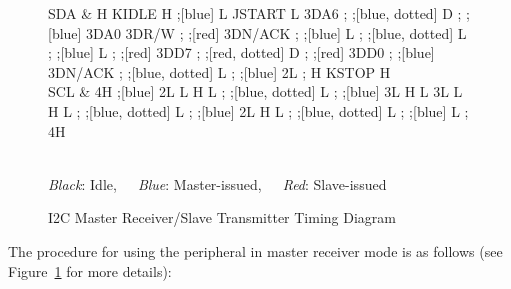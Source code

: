 \begin{figure}[h]
	\centering
	\begin{tikztimingtable}[timing/font=\rmfamily, timing/d/text/.append style={font=\rmfamily}, xscale=1.5, yscale=2, timing/slope=0.2, timing/dslope=0.2, timing/d/background/.style={fill=white},
		timing/metachar={{K}[2]{#1H !{++(-.5\xunit + 0.5*\slope\xunit, -.5\yunit)} N[rectangle,scale=.6]{#2} !{++(.5\xunit - 0.5*\slope\xunit, +.5\yunit)}}},
		timing/metachar={{J}[2]{#1L !{++(-.5\xunit + 0.5*\slope\xunit, +.5\yunit)} N[rectangle,scale=.6]{#2} !{++(.5\xunit - 0.5*\slope\xunit, -.5\yunit)}}},]
		SDA & H K{IDLE} H ;[blue] L J{START} L 3D{A6} ; ;[blue, dotted] D{} ; ;[blue] 3D{A0} 3D{R/W} ; ;[red] 3D{N/ACK} ; ;[blue] L ;    ;[blue, dotted] L ; ;[blue] L ; ;[red] 3D{D7} ; ;[red, dotted] D{} ; ;[red] 3D{D0} ; ;[blue] 3D{N/ACK} ; ;[blue, dotted] L ; ;[blue] 2L ; H K{STOP} H \\
		SCL & 4H ;[blue] 2L L H L ; ;[blue, dotted] L ; ;[blue] 3{L H L} 3L    L H L ; ;[blue, dotted] L ; ;[blue] 2{L H L} ; ;[blue, dotted] L ; ;[blue] L ; 4H \\
		\begin{extracode}
		\end{extracode}
	\end{tikztimingtable}
	\\
	\textit{Black}: Idle,~~~{\color{blue}\textit{Blue}: Master-issued},~~~{\color{red}\textit{Red}: Slave-issued}
	\caption{I2C Master Receiver/Slave Transmitter Timing Diagram}
	\label{fig:i2c-master-receiver}
\end{figure}

The procedure for using the  peripheral in master receiver mode is as follows (see Figure~\ref{fig:i2c-master-receiver} for more details):

